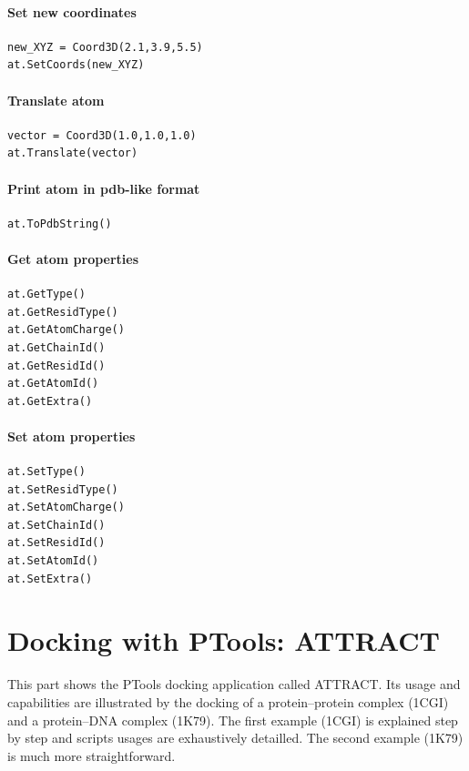\documentclass[12pt,a4paper]{article}
\begin{document}
\paragraph{Set new coordinates}
\begin{verbatim}
new_XYZ = Coord3D(2.1,3.9,5.5)
at.SetCoords(new_XYZ)
\end{verbatim}

\paragraph{Translate atom}
\begin{verbatim}
vector = Coord3D(1.0,1.0,1.0)
at.Translate(vector)
\end{verbatim}


\paragraph{Print atom in pdb-like format}
\begin{verbatim}
at.ToPdbString()
\end{verbatim}

\paragraph{Get atom properties}
\begin{verbatim}
at.GetType()
at.GetResidType()
at.GetAtomCharge()
at.GetChainId()
at.GetResidId()
at.GetAtomId()
at.GetExtra()
\end{verbatim}

\paragraph{Set atom properties}
\begin{verbatim}
at.SetType()
at.SetResidType()
at.SetAtomCharge()
at.SetChainId()
at.SetResidId()
at.SetAtomId()
at.SetExtra()
\end{verbatim}

\section{Docking with PTools: ATTRACT}

This part shows the PTools docking application called ATTRACT\cite{Zacharias2005}. Its usage and 
capabilities are illustrated by the docking of a protein--protein complex (1CGI) 
and a protein--DNA complex\cite{Poulain2008} (1K79). The first example (1CGI) is explained 
step by step and scripts usages are exhaustively detailled. The second example 
(1K79) is much more straightforward.
\end{document}
